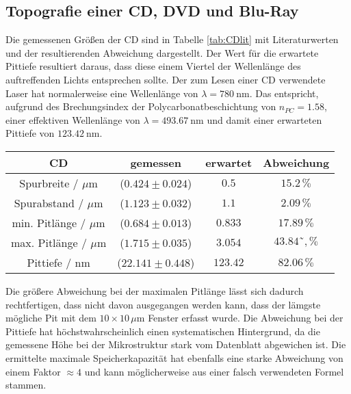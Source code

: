     \subsection{Topografie einer CD, DVD und Blu-Ray}
        Die gemessenen Größen der CD sind in Tabelle \ref{tab:CDlit} mit Literaturwerten und der resultierenden Abweichung dargestellt. Der Wert für die erwartete Pittiefe resultiert daraus, dass diese einem Viertel der Wellenlänge des auftreffenden Lichts entsprechen sollte. Der zum Lesen einer CD verwendete Laser hat normalerweise eine Wellenlänge von $\lambda=\SI{780}{\nano\metre}$. Das entspricht, aufgrund des Brechungsindex der Polycarbonatbeschichtung von $n_{PC}=1.58$, einer effektiven Wellenlänge von $\lambda=\SI{493.67}{\nano\metre}$ und damit einer erwarteten Pittiefe von $\SI{123.42}{\nano\metre}$.
        \begin{center}
            \label{tab:CDlit}
            \begin{tabular}{c c c c}
                \toprule
                CD & gemessen & erwartet & Abweichung \\
                \midrule
                Spurbreite / $\mu\text{m}$    & ($0.424\pm 0.024$) & $0.5$   & $15.2\,\%$ \\
                Spurabstand / $\mu\text{m}$   & ($1.123\pm 0.032$) & $1.1$   & $2.09\,\%$ \\
                min. Pitlänge / $\mu\text{m}$ & ($0.684\pm 0.013$) & $0.833$ & $17.89\,\%$ \\
                max. Pitlänge / $\mu\text{m}$ & ($1.715\pm 0.035$) & $3.054$ & $43.84˜,\%$ \\
                Pittiefe / $\text{nm}$         & ($22.141\pm 0.448$)& $123.42$& $82.06\,\%$ \\
                \bottomrule
            \end{tabular}
        \end{center}
        Die größere Abweichung bei der maximalen Pitlänge lässt sich dadurch rechtfertigen, dass nicht davon ausgegangen werden kann, dass der lämgste mögliche Pit mit dem $10\times 10\,\mu\text{m}$ Fenster erfasst wurde. Die Abweichung bei der Pittiefe hat höchstwahrscheinlich einen systematischen Hintergrund, da die gemessene Höhe bei der Mikrostruktur stark vom Datenblatt abgewichen ist.
        Die ermittelte maximale Speicherkapazität hat ebenfalls eine starke Abweichung von einem Faktor $\approx 4$ und kann möglicherweise aus einer falsch verwendeten Formel stammen.

